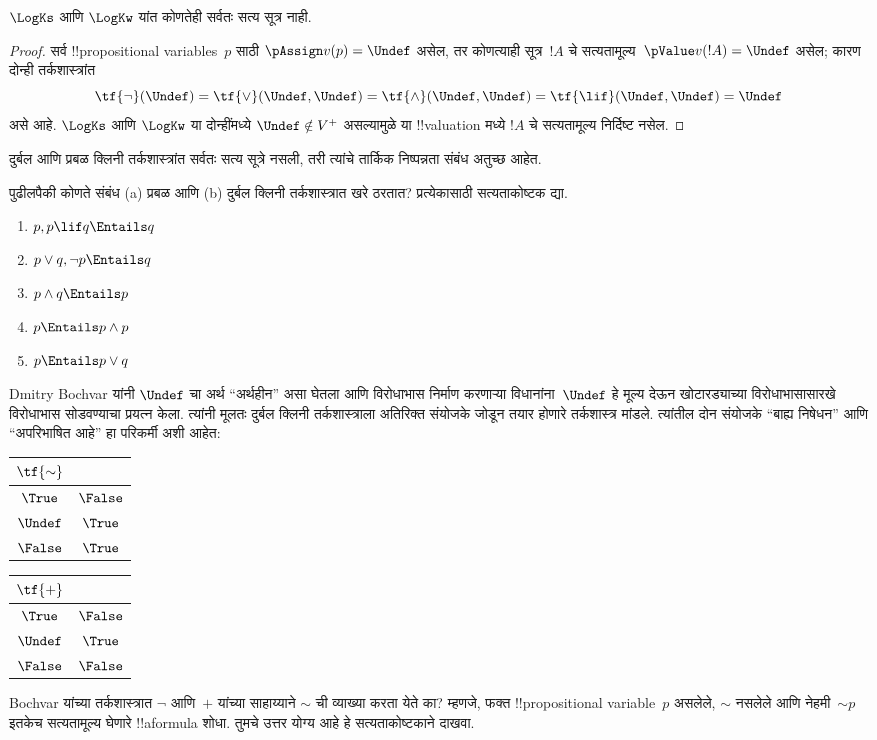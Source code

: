\documentclass[../../../include/open-logic-section]{subfiles}
\begin{document}
\begin{prop}
  $\LogKs$ आणि $\LogKw$ यांत कोणतेही सर्वतः सत्य सूत्र नाही.
\end{prop}

\begin{proof}
  सर्व !!{propositional variable}s~$p$ साठी
  $\pAssign v(p) = \Undef$ असेल, तर कोणत्याही
  सूत्र~$!A$ चे सत्यतामूल्य~$\pValue v(!A) =
  \Undef$ असेल; कारण दोन्ही तर्कशास्त्रांत
  \[
    \tf{\lnot}(\Undef) = \tf{\lor}(\Undef, \Undef) = \tf{\land}(\Undef,
  \Undef) = \tf{\lif}(\Undef, \Undef) = \Undef
  \]
  असे आहे. $\LogKs$ आणि $\LogKw$ या दोन्हींमध्ये
  $\Undef \notin V^+$ असल्यामुळे या !!{valuation} मध्ये
  $!A$ चे सत्यतामूल्य निर्दिष्ट नसेल.
\end{proof}

दुर्बल आणि प्रबळ क्लिनी तर्कशास्त्रांत सर्वतः सत्य सूत्रे
नसली, तरी त्यांचे तार्किक निष्पन्नता संबंध अतुच्छ आहेत.

\begin{prob}
  पुढीलपैकी कोणते संबंध (a) प्रबळ आणि (b) दुर्बल क्लिनी
  तर्कशास्त्रात खरे ठरतात? प्रत्येकासाठी सत्यताकोष्टक द्या.
  \begin{enumerate}
    \item $p, p \lif q \Entails q$
    \item $p \lor q, \lnot p \Entails q$
    \item $p \land q \Entails p$
    \item $p \Entails p \land p$
    \item $p \Entails p \lor q$
  \end{enumerate}
\end{prob}

Dmitry Bochvar यांनी $\Undef$ चा अर्थ ``अर्थहीन'' असा घेतला
आणि विरोधाभास निर्माण करणाऱ्या विधानांना~$\Undef$ हे मूल्य
देऊन खोटारड्याच्या विरोधाभासासारखे विरोधाभास सोडवण्याचा
प्रयत्न केला. त्यांनी मूलतः दुर्बल क्लिनी तर्कशास्त्राला
अतिरिक्त संयोजके जोडून तयार होणारे तर्कशास्त्र मांडले.
त्यांतील दोन संयोजके ``बाह्य निषेधन'' आणि ``अपरिभाषित
आहे'' हा परिकर्मी अशी आहेत:
\begin{center}
  \begin{tabular}{c|c}
    $\tf{\sim}$ & \\
    \hline
    $\True$ & $\False$ \\
    $\Undef$ & $\True$ \\
    $\False$ & $\True$
  \end{tabular}
\quad
  \begin{tabular}{c|c}
    $\tf{+}$ & \\
    \hline
    $\True$ & $\False$ \\
    $\Undef$ & $\True$ \\
    $\False$ & $\False$
  \end{tabular}
\end{center}

\begin{prob}
  Bochvar यांच्या तर्कशास्त्रात $\lnot$ आणि~$+$ यांच्या
  साहाय्याने $\sim$ ची व्याख्या करता येते का? म्हणजे, फक्त
  !!{propositional
  variable}~$p$ असलेले, $\sim$ नसलेले
  आणि नेहमी~$\mathord{\sim}p$ इतकेच सत्यतामूल्य घेणारे
  !!a{formula} शोधा. तुमचे उत्तर योग्य आहे हे
  सत्यताकोष्टकाने दाखवा.
\end{prob}
\end{document}
